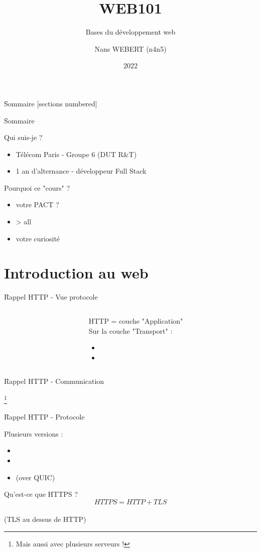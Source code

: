 \documentclass[12pt,aspectratio=169]{beamer}
\title{WEB101}
\subtitle{Bases du développement web}
\date{2022}
\author{Nans WEBERT (n4n5)}
\institute{Télécom Paris}
\begin{document}
\maketitle

\f{Sommaire}{
  [sections numbered]
  \tableofcontents[hideallsubsections]
}

\f{Sommaire}{
Qui suis-je ?
\begin{itemize}
    \item Télécom Paris - Groupe 6 (DUT R\&T)
    \item 1 an d'alternance - développeur Full Stack \js
\end{itemize}
Pourquoi ce "cours" ?
\begin{itemize}
    \item votre PACT ?
    \item \js > all
    \item votre curiosité
\end{itemize}
}

\section{Introduction au web}

\f{Rappel HTTP - Vue protocole}{
\begin{columns}
\begin{column}{0.5\textwidth}
\end{column}
\begin{column}{0.5\textwidth}
    HTTP = couche "Application"\\
    Sur la couche "Transport" :
    \begin{itemize}
        \item {}
        \item {}
    \end{itemize}
\end{column}
\end{columns}
}


\f{Rappel HTTP - Communication}{
\begin{center}
\cite{http-com}\footnote{Mais aussi avec plusieurs serveurs !}
\end{center}
}

\f{Rappel HTTP - Protocole}{
Plusieurs versions :
\begin{itemize}
    \item {}
    \item {}
    \item {} (over QUIC)
\end{itemize}
Qu'est-ce que HTTPS ?\\
$$HTTPS = HTTP + TLS$$\\
(TLS au dessus de HTTP)
}
\end{document}
